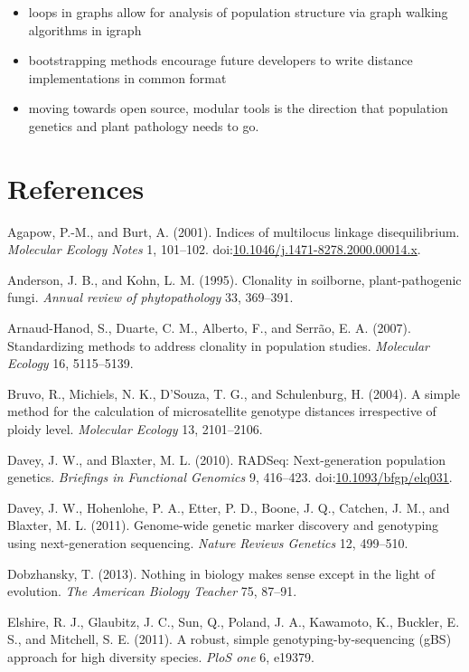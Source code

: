 \documentclass{frontiersSCNS} %
\begin{document}
\begin{itemize}
\itemsep1pt\parskip0pt
\item
  loops in graphs allow for analysis of population structure via graph
  walking algorithms in igraph
\item
  bootstrapping methods encourage future developers to write distance
  implementations in common format
\item
  moving towards open source, modular tools is the direction that
  population genetics and plant pathology needs to go.
\end{itemize}

\section*{References}\label{references}

Agapow, P.-M., and Burt, A. (2001). Indices of multilocus linkage
disequilibrium. \emph{Molecular Ecology Notes} 1, 101--102.
doi:\href{http://dx.doi.org/10.1046/j.1471-8278.2000.00014.x}{10.1046/j.1471-8278.2000.00014.x}.

Anderson, J. B., and Kohn, L. M. (1995). Clonality in soilborne,
plant-pathogenic fungi. \emph{Annual review of phytopathology} 33,
369--391.

Arnaud-Hanod, S., Duarte, C. M., Alberto, F., and Serr{ã}o, E. A.
(2007). Standardizing methods to address clonality in population
studies. \emph{Molecular Ecology} 16, 5115--5139.

Bruvo, R., Michiels, N. K., D'Souza, T. G., and Schulenburg, H. (2004).
A simple method for the calculation of microsatellite genotype distances
irrespective of ploidy level. \emph{Molecular Ecology} 13, 2101--2106.

Davey, J. W., and Blaxter, M. L. (2010). RADSeq: Next-generation
population genetics. \emph{Briefings in Functional Genomics} 9,
416--423.
doi:\href{http://dx.doi.org/10.1093/bfgp/elq031}{10.1093/bfgp/elq031}.

Davey, J. W., Hohenlohe, P. A., Etter, P. D., Boone, J. Q., Catchen, J.
M., and Blaxter, M. L. (2011). Genome-wide genetic marker discovery and
genotyping using next-generation sequencing. \emph{Nature Reviews
Genetics} 12, 499--510.

Dobzhansky, T. (2013). Nothing in biology makes sense except in the
light of evolution. \emph{The American Biology Teacher} 75, 87--91.

Elshire, R. J., Glaubitz, J. C., Sun, Q., Poland, J. A., Kawamoto, K.,
Buckler, E. S., and Mitchell, S. E. (2011). A robust, simple
genotyping-by-sequencing (gBS) approach for high diversity species.
\emph{PloS one} 6, e19379.
\end{document}
